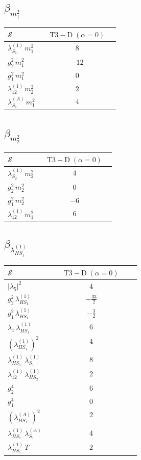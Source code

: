 \documentclass[9pt]{article}
\begin{document}
\subsection*{$ \beta_{m_1^{2}} $}
\begin{longtable}{@{}p{0.31\linewidth}c@{}}
\toprule
$\mathcal{S}$ & $ \mathrm{T3-D}\;(\alpha=0) $ \\
\midrule
$ \lambda_{S_1}^{(1)}\,m_1^{2} $ & $ 8 $ \\
$ g_2^2\,m_1^{2} $ & $ -12 $ \\
$ g_1^2\,m_1^{2} $ & $ 0 $ \\
$ \lambda_{12}^{(1)}\,m_2^{2} $ & $ 2 $ \\
$ \lambda_{S_1}^{(A)}\,m_1^{2} $ & $ 4 $ \\
\bottomrule
\end{longtable}
\subsection*{$ \beta_{m_2^{2}} $}
\begin{longtable}{@{}p{0.31\linewidth}c@{}}
\toprule
$\mathcal{S}$ & $ \mathrm{T3-D}\;(\alpha=0) $ \\
\midrule
$ \lambda_{S_2}^{(1)}\,m_2^{2} $ & $ 4 $ \\
$ g_2^2\,m_2^{2} $ & $ 0 $ \\
$ g_1^2\,m_2^{2} $ & $ -6 $ \\
$ \lambda_{12}^{(1)}\,m_1^{2} $ & $ 6 $ \\
\bottomrule
\end{longtable}
\subsection*{$ \beta_{\lambda_{HS_1}^{(1)}} $}
\begin{longtable}{@{}p{0.31\linewidth}c@{}}
\toprule
$\mathcal{S}$ & $ \mathrm{T3-D}\;(\alpha=0) $ \\
\midrule
$ |\lambda_5|^2 $ & $ 4 $ \\
$ g_2^2\,\lambda_{HS_1}^{(1)} $ & $ - \frac{33}{2} $ \\
$ g_1^2\,\lambda_{HS_1}^{(1)} $ & $ - \frac{3}{2} $ \\
$ \lambda_1\,\lambda_{HS_1}^{(1)} $ & $ 6 $ \\
$ \left(\lambda_{HS_1}^{(1)}\right)^2 $ & $ 4 $ \\
$ \lambda_{HS_1}^{(1)}\,\lambda_{S_1}^{(1)} $ & $ 8 $ \\
$ \lambda_{12}^{(1)}\,\lambda_{HS_2}^{(1)} $ & $ 2 $ \\
$ g_2^4 $ & $ 6 $ \\
$ g_1^4 $ & $ 0 $ \\
$ \left(\lambda_{HS_1}^{(A)}\right)^2 $ & $ 2 $ \\
$ \lambda_{HS_1}^{(1)}\,\lambda_{S_1}^{(A)} $ & $ 4 $ \\
$ \lambda_{HS_1}^{(1)}\,T $ & $ 2 $ \\
\bottomrule
\end{longtable}
\end{document}
